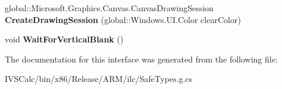 \begin{DoxyCompactItemize}
\item 
\mbox{\label{interface_microsoft_1_1_graphics_1_1_canvas_1_1_i_canvas_swap_chain_ad982604c4c691d7ca1af93bcd60455f2}} 
global\+::\+Microsoft.\+Graphics.\+Canvas.\+Canvas\+Drawing\+Session {\bfseries Create\+Drawing\+Session} (global\+::\+Windows.\+U\+I.\+Color clear\+Color)
\item 
\mbox{\label{interface_microsoft_1_1_graphics_1_1_canvas_1_1_i_canvas_swap_chain_a31ac623b91f0f24a54eaa1f47475c056}} 
void {\bfseries Wait\+For\+Vertical\+Blank} ()
\end{DoxyCompactItemize}


The documentation for this interface was generated from the following file\+:\begin{DoxyCompactItemize}
\item 
I\+V\+S\+Calc/bin/x86/\+Release/\+A\+R\+M/ilc/Safe\+Types.\+g.\+cs\end{DoxyCompactItemize}
